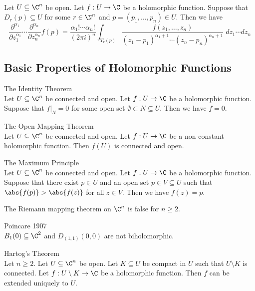 \documentclass[a4paper]{article}
\begin{document}
\begin{prp}{}{}\\
Let $U\subseteq\C^n$ be open. Let $f:U\to\C$ be a holomorphic function. Suppose that $D_r(p)\subseteq U$ for some $r\in\N^n$ and $p=(p_1,\dots,p_n)\in U$. Then we have $$\frac{\partial^{\alpha_1}}{\partial z_1^{\alpha_1}}\cdots\frac{\partial^{\alpha_n}}{\partial z_n^{\alpha_n}}f(p)=\frac{\alpha_1!\cdots\alpha_n!}{(2\pi i)^n}\int_{T_r(p)}\frac{f(z_1,\dots,z_n)}{(z_1-p_1)^{\alpha_1+1}\cdots(z_n-p_n)^{\alpha_n+1}}\;dz_1\cdots dz_n$$
\end{prp}

\subsection{Basic Properties of Holomorphic Functions}
\begin{thm}{The Identity Theorem}{}\\
Let $U\subseteq\C^n$ be connected and open. Let $f:U\to\C$ be a holomorphic function. Suppose that $f|_N=0$ for some open set $\emptyset\subset N\subseteq U$. Then we have $f=0$. 
\end{thm}

\begin{thm}{The Open Mapping Theorem}{}\\
Let $U\subseteq\C^n$ be connected and open. Let $f:U\to\C$ be a non-constant holomorphic function. Then $f(U)$ is connected and open. 
\end{thm}


\begin{thm}{The Maximum Principle}{}\\
Let $U\subseteq\C^n$ be connected and open. Let $f:U\to\C$ be a holomorphic function. Suppose that there exist $p\in U$ and an open set $p\in V\subseteq U$ such that $\abs{f(p)}>\abs{f(z)}$ for all $z\in V$. Then we have $f(z)=p$. 
\end{thm}

The Riemann mapping theorem on $\C^n$ is false for $n\geq 2$. 

\begin{eg}{Poincare 1907}{}\\
$B_1(0)\subseteq\C^2$ and $D_{(1,1)}(0,0)$ are not biholomorphic. 
\end{eg}

\begin{thm}{Hartog's Theorem}{}\\
Let $n\geq 2$. Let $U\subseteq\C^n$ be open. Let $K\subseteq U$ be compact in $U$ such that $U\setminus K$ is connected. Let $f:U\setminus K\to\C$ be a holomorphic function. Then $f$ can be extended uniquely to $U$. 
\end{thm}
\end{document}
